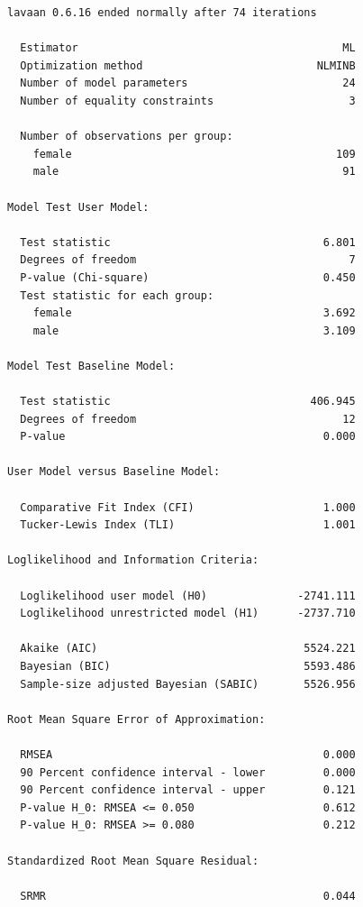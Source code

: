 \documentclass[
  letterpaper,
  DIV=11,
  numbers=noendperiod]{scrreprt}
\begin{document}
\begin{verbatim}
lavaan 0.6.16 ended normally after 74 iterations

  Estimator                                         ML
  Optimization method                           NLMINB
  Number of model parameters                        24
  Number of equality constraints                     3

  Number of observations per group:                   
    female                                         109
    male                                            91

Model Test User Model:
                                                      
  Test statistic                                 6.801
  Degrees of freedom                                 7
  P-value (Chi-square)                           0.450
  Test statistic for each group:
    female                                       3.692
    male                                         3.109

Model Test Baseline Model:

  Test statistic                               406.945
  Degrees of freedom                                12
  P-value                                        0.000

User Model versus Baseline Model:

  Comparative Fit Index (CFI)                    1.000
  Tucker-Lewis Index (TLI)                       1.001

Loglikelihood and Information Criteria:

  Loglikelihood user model (H0)              -2741.111
  Loglikelihood unrestricted model (H1)      -2737.710
                                                      
  Akaike (AIC)                                5524.221
  Bayesian (BIC)                              5593.486
  Sample-size adjusted Bayesian (SABIC)       5526.956

Root Mean Square Error of Approximation:

  RMSEA                                          0.000
  90 Percent confidence interval - lower         0.000
  90 Percent confidence interval - upper         0.121
  P-value H_0: RMSEA <= 0.050                    0.612
  P-value H_0: RMSEA >= 0.080                    0.212

Standardized Root Mean Square Residual:

  SRMR                                           0.044


\end{verbatim}
\end{document}

